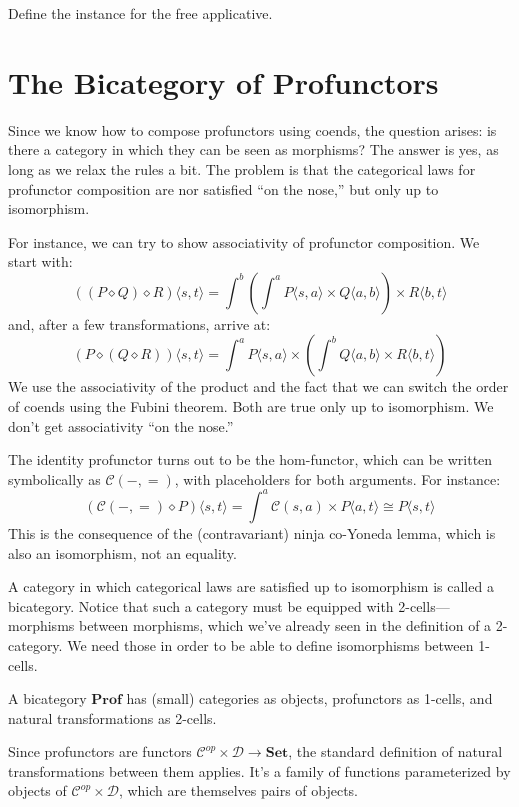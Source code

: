 \documentclass[DaoFP]{subfiles}
\begin{document}
\begin{exercise}
Define the  instance for the free applicative.
\end{exercise}


\section{The Bicategory of Profunctors}

Since we know how to compose profunctors using coends, the question arises: is there a category in which they can be seen as morphisms? The answer is yes, as long as we relax the rules a bit. The problem is that the categorical laws for profunctor composition are nor satisfied ``on the nose,'' but only up to isomorphism. 

For instance, we can try to show associativity of profunctor composition. We start with:
\[ ((P \diamond Q) \diamond R) \langle s, t \rangle = \int^b \left( \int^a P \langle s, a \rangle \times Q \langle a, b \rangle \right) \times R \langle b,  t \rangle \]
and, after a few transformations, arrive at:
\[ (P \diamond (Q \diamond R)) \langle s, t \rangle =  \int^a P \langle s, a \rangle \times \left( \int^b Q \langle a, b \rangle \times R \langle b,  t \rangle \right) \]
We use the associativity of the product and the fact that we can switch the order of coends using the Fubini theorem. Both are true only up to isomorphism. We don't get associativity ``on the nose.''

The identity profunctor turns out to be the hom-functor, which can be written symbolically as $\mathcal{C}(-, =)$, with placeholders for both arguments. For instance:
\[ \left( \mathcal{C}(-, =) \diamond P \right) \langle s, t \rangle = \int^a  \mathcal{C}(s, a) \times P \langle a, t \rangle \cong P \langle s, t \rangle \]
This is the consequence of the (contravariant) ninja co-Yoneda lemma, which is also an isomorphism, not an equality.

A category in which categorical laws are satisfied up to isomorphism is called a bicategory. Notice that such a category must be equipped with 2-cells---morphisms between morphisms, which we've already seen in the definition of a 2-category. We need those in order to be able to define isomorphisms between 1-cells. 

A bicategory $\mathbf{Prof}$ has (small) categories as objects, profunctors as 1-cells, and natural transformations as 2-cells. 

Since profunctors are functors $\mathcal{C}^{op} \times  \mathcal{D} \to \mathbf{Set}$, the standard definition of natural transformations between them applies. It's a family of functions parameterized by objects of $\mathcal{C}^{op} \times  \mathcal{D}$, which are themselves pairs of objects. 
\end{document}
